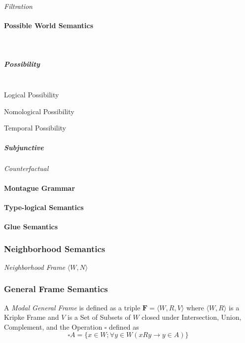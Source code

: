 \emph{Filtration}



\paragraph{Possible World Semantics}\label{sec:possible_world}
\hfill \\

\subparagraph{Possibility}\label{sec:possibility}
\hfill \\

Logical Possibility

Nomological Possibility

Temporal Possibility

\subparagraph{Subjunctive}\label{sec:subjunctive}

\emph{Counterfactual}



\paragraph{Montague Grammar}\label{sec:montague_grammar}

\paragraph{Type-logical Semantics}\label{sec:typelogical_semantics}

\paragraph{Glue Semantics}\label{sec:glue_semantics}



\subsubsection{Neighborhood Semantics}
\label{sec:neighborhood_semantics}

\emph{Neighborhood Frame} $\langle W, N \rangle$



\subsubsection{General Frame Semantics}
\label{sec:general_frame_semantics}

A \emph{Modal General Frame} is defined as a triple $\mathbf{F} =
\langle W,R,V \rangle$ where $\langle W,R \rangle$ is a Kripke Frame
and $V$ is a Set of Subsets of $W$ closed under Intersection, Union,
Complement, and the Operation $\square$ defined as
\[
    \square A = \{x \in W; \forall y \in W ( x R y \rightarrow y \in A ) \}
\]



